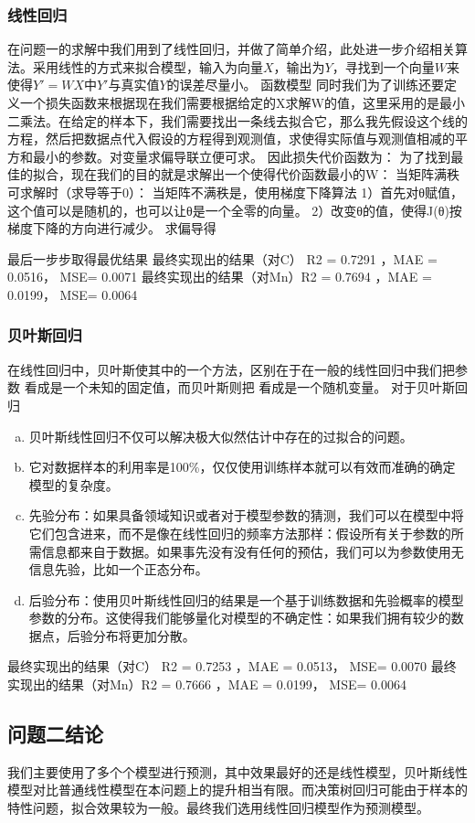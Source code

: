 \documentclass{xcumcmart}
\begin{document}
\subsubsection{线性回归}
\par 在问题一的求解中我们用到了线性回归，并做了简单介绍，此处进一步介绍相关算法。采用线性的方式来拟合模型，输入为向量$X$，输出为$Y$，寻找到一个向量$W$来使得$Y'=WX$中$Y'$与真实值$Y$的误差尽量小。
函数模型
同时我们为了训练还要定义一个损失函数来根据现在我们需要根据给定的X求解W的值，这里采用的是最小二乘法。在给定的样本下，我们需要找出一条线去拟合它，那么我先假设这个线的方程，然后把数据点代入假设的方程得到观测值，求使得实际值与观测值相减的平方和最小的参数。对变量求偏导联立便可求。
因此损失代价函数为：
为了找到最佳的拟合，现在我们的目的就是求解出一个使得代价函数最小的W：
当矩阵满秩可求解时（求导等于0）：
当矩阵不满秩是，使用梯度下降算法
1）首先对θ赋值，这个值可以是随机的，也可以让θ是一个全零的向量。
2）改变θ的值，使得J(θ)按梯度下降的方向进行减少。
求偏导得

最后一步步取得最优结果
最终实现出的结果（对C） R2 = 0.7291 ，MAE = 0.0516， MSE= 0.0071
最终实现出的结果（对Mn）R2 = 0.7694 ，MAE = 0.0199， MSE= 0.0064
\subsubsection{贝叶斯回归}
\par 在线性回归中，贝叶斯使其中的一个方法，区别在于在一般的线性回归中我们把参数 看成是一个未知的固定值，而贝叶斯则把 看成是一个随机变量。
对于贝叶斯回归
\begin{enumerate}[(a)]
\item 贝叶斯线性回归不仅可以解决极大似然估计中存在的过拟合的问题。
\item 它对数据样本的利用率是100\%，仅仅使用训练样本就可以有效而准确的确定模型的复杂度。
\item 先验分布：如果具备领域知识或者对于模型参数的猜测，我们可以在模型中将它们包含进来，而不是像在线性回归的频率方法那样：假设所有关于参数的所需信息都来自于数据。如果事先没有没有任何的预估，我们可以为参数使用无信息先验，比如一个正态分布。
\item 后验分布：使用贝叶斯线性回归的结果是一个基于训练数据和先验概率的模型参数的分布。这使得我们能够量化对模型的不确定性：如果我们拥有较少的数据点，后验分布将更加分散。
\end{enumerate}

最终实现出的结果（对C） R2 = 0.7253 ，MAE = 0.0513， MSE= 0.0070
最终实现出的结果（对Mn）R2 = 0.7666 ，MAE = 0.0199， MSE= 0.0064
\subsection{问题二结论}
我们主要使用了多个个模型进行预测，其中效果最好的还是线性模型，贝叶斯线性模型对比普通线性模型在本问题上的提升相当有限。而决策树回归可能由于样本的特性问题，拟合效果较为一般。最终我们选用线性回归模型作为预测模型。
\end{document}
